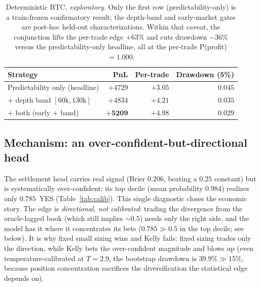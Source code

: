 \documentclass{article}
\begin{document}
\begin{table}[t]
\centering
\small
\begin{tabular}{lrrr}
\toprule
Strategy & PnL & Per-trade & Drawdown (5\%) \\
\midrule
Predictability only (headline) & $+4729$ & $+3.05$ & $0.045$ \\
\quad $+$ depth band $[60\text{k},130\text{k}]$ & $+4834$ & $+4.21$ & $0.035$ \\
\quad $+$ both (early $+$ band) & $\mathbf{+5209}$ & $\mathbf{+4.98}$ & $\mathbf{0.029}$ \\
\bottomrule
\end{tabular}
\caption{Deterministic BTC, \emph{exploratory}.  Only the first row
(predictability-only) is a train-frozen confirmatory result; the depth-band
and early-market gates are post-hoc held-out characterizations.  Within that
caveat, the conjunction lifts the per-trade edge $+63\%$ and cuts drawdown
$-36\%$ versus the predictability-only headline, all at the per-trade
P(profit)$=1.000$.}
\label{tab:conjunction}
\end{table}

\subsection{Mechanism: an over-confident-but-directional head}\label{sec:results_mech}

The settlement head carries real signal (Brier $0.206$, beating a
$0.25$ constant) but is systematically over-confident: its top decile
(mean probability $0.984$) realizes only $0.785$~YES
(Table~\ref{tab:calib}).  This single diagnostic closes the economic
story.  The edge is \emph{directional, not calibrated}: trading the
divergence from the oracle-lagged book (which still implies $\sim 0.5$)
needs only the right side, and the model has it where it concentrates its
bets ($0.785 \gg 0.5$ in the top decile; see below).  It is
why fixed small sizing wins and Kelly fails: fixed sizing trades only the
direction, while Kelly bets the over-confident magnitude and blows up
(even temperature-calibrated at $T=2.9$, the bootstrap drawdown is
$39.9\% \gg 15\%$, because position concentration sacrifices the
diversification the statistical edge depends on).
\end{document}
